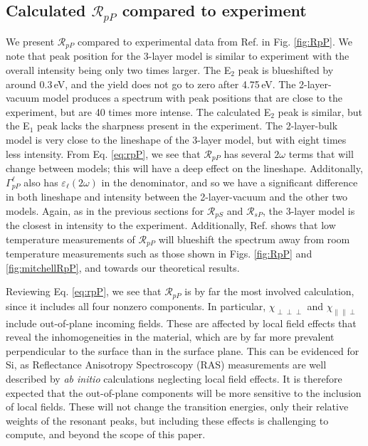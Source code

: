 \documentclass[prb,superscriptaddress,showpacs,twocolumn,letterpaper]{revtex4}
\begin{document}
\subsection{Calculated \texorpdfstring{$\mathcal{R}_{pP}$}{RpP} compared to
experiment}\label{sec:RpP}

We present $\mathcal{R}_{pP}$ compared to experimental data from Ref.
 in Fig. \ref{fig:RpP}. We note that peak position for
the 3-layer model is similar to experiment with the overall intensity being only
two times larger. The E$_{2}$ peak is blueshifted by around 0.3\,eV, and the
yield does not go to zero after 4.75\,eV. The 2-layer-vacuum model produces a
spectrum with peak positions that are close to the experiment, but are 40 times
more intense. The calculated E$_{2}$ peak is similar, but the E$_{1}$ peak lacks
the sharpness present in the experiment. The 2-layer-bulk model is very close to
the lineshape of the 3-layer model, but with eight times less intensity. From
Eq. \eqref{eq:rpP}, we see that $\mathcal{R}_{pP}$ has several $2\omega$ terms
that will change between models; this will have a deep effect on the lineshape.
Additonally, $\Gamma^{\ell}_{pP}$ also has $\varepsilon_{\ell}(2\omega)$ in the
denominator, and so we have a significant difference in both lineshape and
intensity between the 2-layer-vacuum and the other two models. Again, as in the
previous sections for $\mathcal{R}_{pS}$ and $\mathcal{R}_{sP}$, the 3-layer
model is the closest in intensity to the experiment. Additionally, Ref.
 shows that low temperature measurements of
$\mathcal{R}_{pP}$ will blueshift the spectrum away from room temperature
measurements such as those shown in Figs. \ref{fig:RpP} and
\ref{fig:mitchellRpP}, and towards our theoretical results.

Reviewing Eq. \eqref{eq:rpP}, we see that $\mathcal{R}_{pP}$ is by far the most
involved calculation, since it includes all four nonzero components. In
particular, $\chi_{\perp\perp\perp}$ and $\chi_{\parallel\parallel\perp}$
include out-of-plane incoming fields. These are affected by local field
effects\cite{tancognedejean:tel-01235611} that reveal the inhomogeneities in the
material, which are by far more prevalent perpendicular to the surface than in
the surface plane. This can be evidenced for Si, as Reflectance Anisotropy
Spectroscopy (RAS) measurements are well described by \emph{ab initio}
calculations neglecting local field effects.\cite{palummoPRB99, gaalPRB09} It is
therefore expected that the out-of-plane components will be more sensitive to
the inclusion of local fields. These will not change the transition energies,
only their relative weights of the resonant
peaks,\cite{tancognedejean:tel-01235611} but including these effects is
challenging to compute,\cite{nicolasPRB15} and beyond the scope of this paper.
\end{document}
